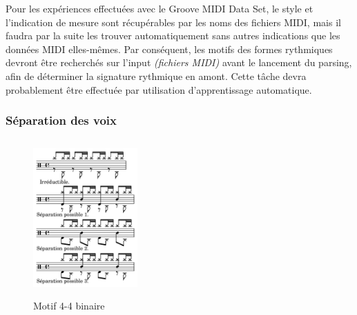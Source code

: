 Pour les expériences effectuées avec le Groove MIDI Data Set, 
le style et l’indication de mesure sont récupérables par les noms des fichiers MIDI, 
mais il faudra par la suite les trouver automatiquement sans autres indications 
que les données  MIDI elles-mêmes. 
Par conséquent, les motifs des formes rythmiques devront être recherchés sur l’input \textit{(fichiers MIDI)} 
avant le lancement du parsing, afin de déterminer la signature rythmique en amont. 
Cette tâche devra probablement être effectuée par utilisation d'apprentissage automatique. %


\subsubsection{Séparation des voix}
\label{sys_sep_voix}
\begin{figure}[h]
	\centering
	\includegraphics[height=60mm, width=40mm]{z_images/3_methodes/2_systemes/1_separation_4-4_binaire.png}
	\caption{Motif 4-4 binaire}
	\label{binaire}
\end{figure}

